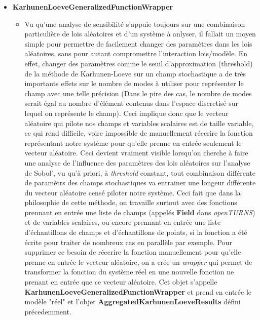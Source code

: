 \documentclass[a4paper,10pt]{article}
\begin{document}
\begin{itemize}
  
  \item \textbf{KarhunenLoeveGeneralizedFunctionWrapper}
  \begin{itemize}
    \item Vu qu'une analyse de sensibilité s'appuie toujours sur une combinaison particulière de lois aléatoires et d'un système à anlyser, il fallait un moyen simple pour permettre de facilement changer des paramètres dans les lois aléatoires, sans pour autant compromettre l'interaction lois/modèle. En effet, changer des paramètres comme le seuil d'approximation (threshold) de la méthode de Karhunen-Loeve sur un champ stochastique a de très importants effets sur le nombre de modes à utiliser pour représenter le champ avec une telle précision (Dans le pire des cas, le nombre de modes serait égal au nombre d'élément contenus dans l'espace discretisé sur lequel on représente le champ). Ceci implique donc que le vecteur aléatoire qui pilote nos champs et variables scalaires est de taille variable, ce qui rend difficile, voire impossible de manuellement réecrire la fonction représentant notre système pour qu'elle prenne en entrée seulement le vecteur aléatoire. Ceci devient vraiment visible lorsqu'on cherche à faire une analyse de l'influence des paramètres des lois aléatoires sur l'analyse de Sobol', vu qu'à priori, à \textit{threshold} constant, tout combinaison différente de paramètrs des champs stochastiques va entrainer une longeur différente du vecteur aléatoire censé piloter notre système. 
  Ceci fait que dans la philosophie de cette méthode, on travaille surtout avec des fonctions prennant en entrée une liste de champs (appelés \textbf{Field} dans \textit{openTURNS}) et de variables scalaires, ou encore prennant en entrée une liste d'échantillons de champs et d'échantillons de points, si la fonction a été écrite pour traiter de nombreux cas en parallèle par exemple.
  Pour supprimer ce besoin de réecrire la fonction manuellement pour qu'elle prenne en entrée le vecteur aléatoire, on a crée un \textit{wrapper} qui permet de transformer la fonction du système réel en une nouvelle fonction ne prenant en entrée que ce vecteur aléatoire. Cet objet s'appelle \textbf{KarhunenLoeveGeneralizedFunctionWrapper} et prend en entrée le modèle "réel" et l'objet \textbf{AggregatedKarhunenLoeveResults} défini précedemment.
  \end{itemize}  
 

\end{itemize}
\end{document}
